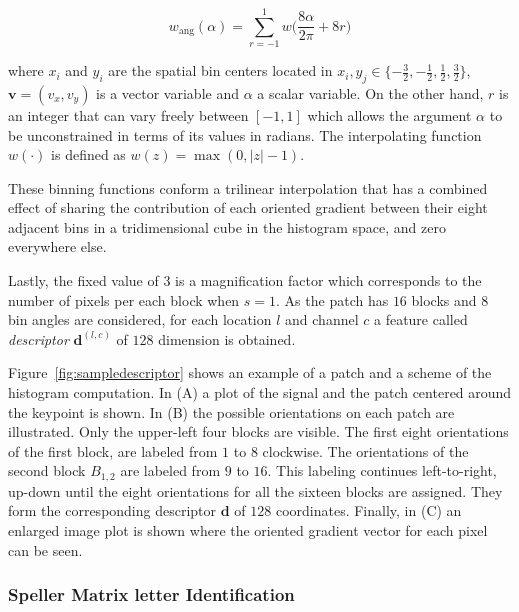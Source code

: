 \documentclass[utf8]{frontiersSCNS} %
\begin{document}
\begin{equation}
 w_\mathrm{ang}(\alpha) = \sum_{r = -1 }^{1} w \bigg( \frac{8\alpha}{2\pi} + 8r \bigg)
\label{eq:wang}
\end{equation}


\noindent where $x_i$ and $y_i$ are the spatial bin centers located in $ x_i,y_j \in \{-\frac{3}{2},-\frac{1}{2},\frac{1}{2},\frac{3}{2}\} $, $\mathbf{v} = ( v_x, v_y ) $ is a vector variable and $\alpha$ a scalar variable.  On the other hand, $r$ is an integer that can vary freely between $ \left[ -1,1 \right]$ which allows the argument $\alpha$ to be unconstrained in terms of its values in radians. The interpolating function $w(\cdot)$ is defined as $ w(z) = \max(0,|z|-1)$.

These binning functions conform a trilinear interpolation that has a combined effect of sharing the contribution of each oriented gradient between their eight adjacent bins in a tridimensional cube in the histogram space, and zero everywhere else.

Lastly, the fixed value of $ 3 $ is a magnification factor which corresponds to the number of pixels per each block when $s = 1$.  As the patch has  $16$ blocks and  $8$ bin angles are considered, for each location $l$ and channel $c$ a feature called \textit{descriptor} $\mathbf{d}^{(l,c)}$  of $128$ dimension is obtained. 

Figure~\ref{fig:sampledescriptor} shows an example of a patch and a scheme of the histogram computation. In (A) a plot of the signal and the patch centered around the keypoint is shown. In (B) the possible orientations on each patch are illustrated.  Only the upper-left four blocks are visible.  The first eight orientations of the first block, are labeled from $1$ to $8$ clockwise. The orientations of the second block $ B_{1,2} $ are labeled from $9$ to $16$.  This labeling continues left-to-right, up-down until the eight orientations for all the sixteen blocks are assigned. They form the corresponding descriptor $\mathbf{d}$ of $128$ coordinates. Finally, in (C) an enlarged image plot is shown where the oriented gradient vector for each pixel can be seen.
 
\subsubsection{Speller Matrix letter Identification}
\label{Classification}
\end{document}
